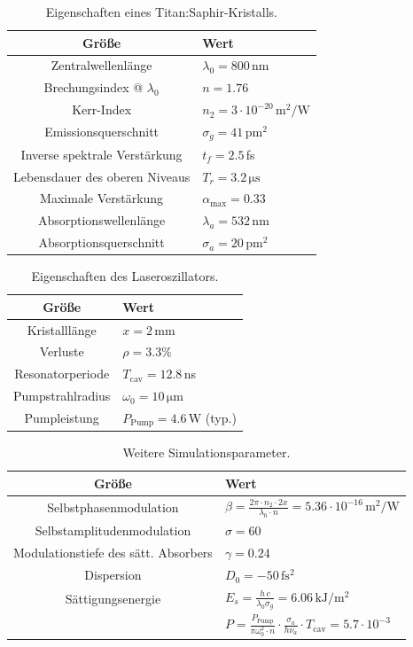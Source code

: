 \documentclass[bachelor,       %
               twoside,        %
               BCOR10mm,       %
               liststotoc,nomtotoc,bibtotoc, %
               english,ngerman, %
               final,          %
               ]{GAUBM}
\begin{document}
\begin{table}[!htb]
	\centering
	\begin{tabular}{|c|l|}
		\hline
		Größe & Wert\\
		\hline
		Zentralwellenlänge & $\lambda_0=800\,$nm\\	
		Brechungsindex @ $\lambda_0$ & $n=1.76$\\
		Kerr-Index & $n_2=3\cdot 10^{-20}\,\si{\meter^2\per\watt}$\\
		Emissionsquerschnitt & $\sigma_g=41\,\si{\pico\meter^2}$\\
		Inverse spektrale Verstärkung & $t_f=2.5\,$fs\\
		Lebensdauer des oberen Niveaus & $T_r=3.2\,\si{\micro\second}$\\
		Maximale Verstärkung & $\alpha_\text{max}=0.33$\\
		Absorptionswellenlänge & $\lambda_a=532\,$nm\\
		Absorptionsquerschnitt & $\sigma_a=20\,\si{\pico\meter^2}$\\
		\hline
	\end{tabular}
	\caption{Eigenschaften eines Titan:Saphir-Kristalls.}
	\label{tab:TiSaProp}
\end{table}

\begin{table}[!htb]
	\centering
	\begin{tabular}{|c|l|}
		\hline
		Größe & Wert\\
		\hline
		Kristalllänge & $x=2\,$mm\\
		Verluste & $\rho=3.3\%$\\
		Resonatorperiode & $T_\text{cav}=12.8\,$ns\\
		Pumpstrahlradius & $\omega_0=10\,\si{\micro\meter}$\\
		Pumpleistung & $P_\text{Pump}=4.6\,$W (typ.)\\
		\hline
	\end{tabular}
	\caption{Eigenschaften des Laseroszillators.}
	\label{tab:RB_Prop}
\end{table}

\begin{table}[!htb]
	\centering
	\begin{tabular}{|c|l|}
		\hline
		Größe & Wert\\
		\hline
		Selbstphasenmodulation & $\beta=\frac{2\pi\cdot n_2\cdot 2x}{\lambda_0\cdot n}=5.36\cdot 10^{-16}\,\si{\meter^2\per\watt}$\\
		Selbstamplitudenmodulation & $\sigma=60$\\
		Modulationstiefe des sätt. Absorbers & $\gamma=0.24$\\
		Dispersion & $D_0=-50\,\si{\femto\second^2}$\\
		Sättigungsenergie & $E_s=\frac{h\,c}{\lambda_0\sigma_g}= 6.06\,\si{\kilo\joule\per\meter^2}$\\
		& $P=\frac{P_\text{Pump}}{\pi\omega_0^2\cdot n}\cdot\frac{\sigma_a}{h\nu_a}\cdot T_\text{cav}=5.7\cdot 10^{-3}$\\
		\hline
	\end{tabular}
	\caption{Weitere Simulationsparameter.}
	\label{tab:SimParam2}
\end{table}
\end{document}
